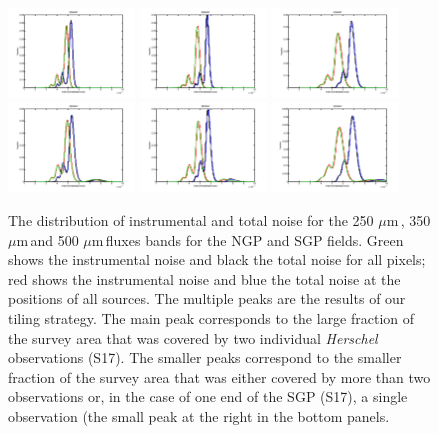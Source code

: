 \documentclass[useAMS,usenatbib]{mn2e}
\def\mic{ $\mu $m\,}
\begin{document}
\begin{figure} %
\includegraphics[width=0.3\textwidth]{flux_noise_250NGP.pdf}
\includegraphics[width=0.3\textwidth]{flux_noise_350NGP.pdf}
\includegraphics[width=0.3\textwidth]{flux_noise_500NGP.pdf}
\includegraphics[width=0.3\textwidth]{flux_noise_250SGP.pdf}
\includegraphics[width=0.3\textwidth]{flux_noise_350SGP.pdf}
\includegraphics[width=0.3\textwidth]{flux_noise_500SGP.pdf}
\caption{The distribution of instrumental and total noise
for
  the 250\mic, 350\mic and 500\mic fluxes bands
for the NGP and SGP fields.
  Green shows the instrumental noise and
black the total noise for all pixels; red shows the
instrumental noise and blue the total noise at the positions of all sources.
The multiple peaks are the results of our tiling strategy. The
main peak corresponds to the large fraction of the survey
area that was covered by two individual {\it Herschel}
observations (S17). The smaller peaks correspond to
the smaller fraction of the survey area that was either
covered by more than two observations or, in the case of one
end of the SGP (S17), a
single observation (the small peak at the right in the bottom
panels.}
\label{fig_noises}
\end{figure}
\end{document}
